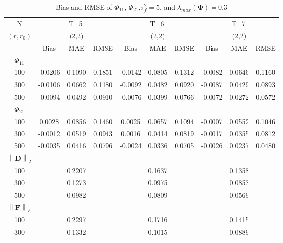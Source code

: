 \documentclass[12pt,a4paper,hyperref]{article}
\begin{document}
\begin{table}[H]
\caption{Bias and RMSE of $\Phi_{11}$, $\Phi_{21}$,$\sigma^{2}_{f}=5$,  and $\lambda_{max}(\boldsymbol{\Phi})=0.3$}
\centering
\tabcolsep=0.11cm
\begin{threeparttable}
\begin{tabular} {*{10}{c}}
\toprule
N& \multicolumn{3}{c}{T=5}&\multicolumn{3}{c}{T=6}&\multicolumn{3}{c}{T=7}\\
\cmidrule(lr){1-10}
$(r,r_{0})$ &   &(2,2)  &  &   &(2,2)  & &  &(2,2) & \\
\cmidrule(lr){1-4} \cmidrule(lr){5-7}\cmidrule(lr){8-10}
& \multicolumn{1}{c}{Bias} &\multicolumn{1}{c}{MAE}& \multicolumn{1}{c}{RMSE}&\multicolumn{1}{c}{Bias} &\multicolumn{1}{c}{MAE}& \multicolumn{1}{c}{RMSE}&\multicolumn{1}{c}{Bias}&\multicolumn{1}{c}{MAE} & \multicolumn{1}{c}{RMSE}\\
  \cmidrule(lr){2-4} \cmidrule(lr){5-7} \cmidrule(lr){8-10}
 $\Phi_{11}$\\
\cmidrule(lr){1-10}
 100&-0.0206 &0.1090 &0.1851 & -0.0142 & 0.0805& 0.1312& -0.0082&0.0646 & 0.1160\\
300&-0.0106 & 0.0662& 0.1180&  -0.0092& 0.0482&0.0920 &-0.0087& 0.0429&0.0893\\
500& -0.0094& 0.0492& 0.0910& -0.0076 & 0.0399& 0.0766& -0.0072& 0.0272& 0.0572\\
\cmidrule(lr){1-10}
$\Phi_{21}$\\
\cmidrule(lr){1-4}   \cmidrule(lr){5-7}   \cmidrule(lr){8-10}
100&0.0028 & 0.0856& 0.1460& 0.0025 &0.0657 &0.1094 & -0.0007& 0.0552& 0.1046\\
300&-0.0012&0.0519& 0.0943& 0.0016 &0.0414 &0.0819& -0.0017& 0.0355&0.0812\\
500&-0.0035&0.0416&0.0796 & -0.0024 & 0.0336& 0.0705& -0.0026& 0.0237& 0.0480\\
\cmidrule(lr){1-10}
$\left\| \boldsymbol{D} \right\|_{2} $\\
\cmidrule(lr){1-4}   \cmidrule(lr){5-7}   \cmidrule(lr){8-10}
100& & 0.2207& &  &0.1637 & & & 0.1358& \\
300& &0.1273 & &  &0.0975& & &0.0853 &\\
500& & 0.0982& &  &0.0809 & & & 0.0569& \\
\cmidrule(lr){1-10}
$\left\| \boldsymbol{F} \right\|_{F} $\\
\cmidrule(lr){1-4}   \cmidrule(lr){5-7}   \cmidrule(lr){8-10}
100& &0.2297& &  & 0.1716& & &0.1415 & \\
300& & 0.1332& &  &0.1015 & & &0.0889 &\\

\end{tabular}
\end{threeparttable}
\end{table}
\end{document}
